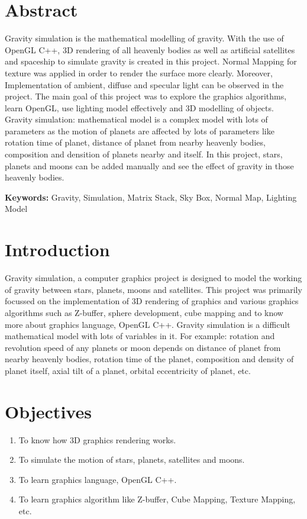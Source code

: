 \documentclass[12pt]{article}
\begin{document}
\clearpage

\tableofcontents
\clearpage

\section{Abstract}
Gravity simulation is the mathematical modelling of gravity. With the use of OpenGL C++, 3D rendering of all heavenly bodies as well as artificial satellites and spaceship to simulate gravity is created in this project. Normal Mapping for texture was applied in order to render the surface more clearly. Moreover, Implementation of ambient, diffuse and specular light can be observed in the project. The main goal of this project was to explore the graphics algorithms, learn OpenGL, use lighting model effectively and 3D modelling of objects. Gravity simulation: mathematical model is a complex model with lots of parameters as the motion of planets are affected by lots of parameters like rotation time of planet, distance of planet from nearby heavenly bodies, composition and densition of planets nearby and itself. In this project, stars, planets and moons can be added manually and see the effect of gravity in those heavenly bodies.

\textbf{Keywords:} Gravity, Simulation, Matrix Stack, Sky Box, Normal Map, Lighting Model 

\section{Introduction}
Gravity simulation, a computer graphics project is designed to model the working of gravity between stars, planets, moons and satellites. This project was primarily focussed on the implementation of 3D rendering of graphics and various graphics algorithms such as Z-buffer, sphere development, cube mapping and to know more about graphics language, OpenGL C++. Gravity simulation is a difficult mathematical model with lots of variables in it. For example: rotation and revolution speed of any planets or moon depends on distance of planet from nearby heavenly bodies, rotation time of the planet, composition and density of planet itself, axial tilt of a planet, orbital eccentricity of planet, etc. 

\section{Objectives}
\begin{enumerate}
	\item To know how 3D graphics rendering works.
	\item To simulate the motion of stars, planets, satellites and moons.
	\item To learn graphics language, OpenGL C++.
	\item To learn graphics algorithm like Z-buffer, Cube Mapping, Texture Mapping, etc. 
\end{enumerate}
   
\end{document}
